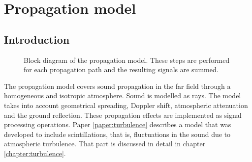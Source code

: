 \section{Propagation model}

\subsection{Introduction}
\begin{wrapfigure}{r}{0.3\textwidth}
  \centering
{}
  \caption{Block diagram of the propagation model. These steps are performed for each propagation path and the resulting signals are summed.}
  \label{fig:propagation_block_diagram}
\end{wrapfigure}



The propagation model covers sound propagation in the far field through a
homogeneous and isotropic atmosphere. Sound is modelled as rays. The
model takes into account geometrical spreading, Doppler shift, atmospheric
attenuation and the ground reflection. These propagation effects are implemented
as signal processing operations.
Paper \ref{paper:turbulence} describes a model that was developed to include
scintillations, that is, fluctuations in the sound due to atmospheric turbulence.
That part is discussed in detail in chapter \ref{chapter:turbulence}.

